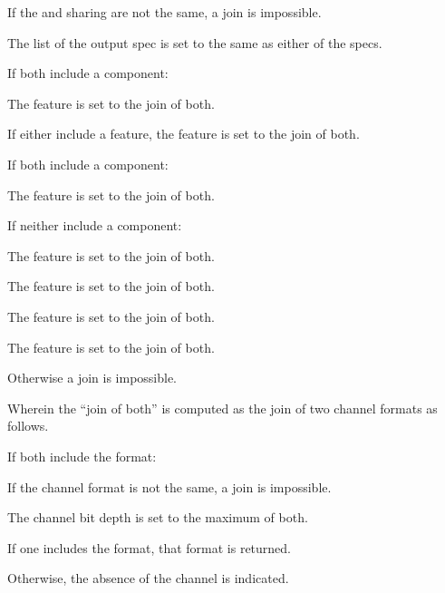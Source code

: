 \documentclass[format=sigconf]{acmart}
\begin{document}
\begin{step}
\item If the  and sharing are not the same, a join is impossible.
\item The  list of the output spec is set to the same as either of the specs.
\item If both include a  component:
  \begin{step}
  \item The  feature is set to the join of both.
  \item If either include a  feature, the  feature is set to the join of both.
  \end{step}
\item If both include a  component:
  \begin{step}
  \item The  feature is set to the join of both.
  \end{step}
\item If neither include a  component:
  \begin{step}
  \item The  feature is set to the join of both.
  \item The  feature is set to the join of both.
  \item The  feature is set to the join of both.
  \item The  feature is set to the join of both.
  \end{step}
\item Otherwise a join is impossible.
\end{step}

Wherein the ``join of both'' is computed as the join of two channel formats as follows.

\begin{step}
\item If both include the format:
  \begin{step}
  \item If the channel format is not the same, a join is impossible.
  \item The channel bit depth is set to the maximum of both.
  \end{step}
\item If one includes the format, that format is returned.
\item Otherwise, the absence of the channel is indicated.
\end{step}
\end{document}
